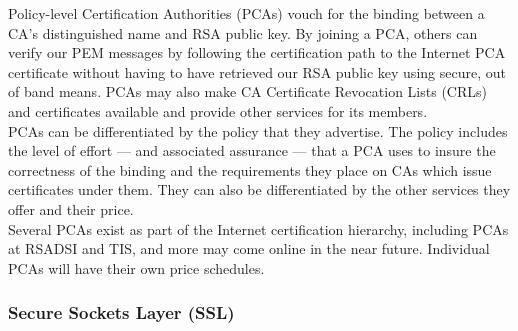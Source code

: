 \begin{htmllist}
    Policy-level Certification Authorities (PCAs) vouch for the binding
    between a CA's distinguished name and RSA public key. By joining a PCA,
    others can verify our PEM messages by following the certification path
    to the Internet PCA certificate without having to have retrieved our
    RSA public key using secure, out of band means. PCAs may also make CA
    Certificate Revocation Lists (CRLs) and certificates available and
    provide other services for its members.\\
    
    PCAs can be differentiated by the policy that they advertise. The
    policy includes the level of effort --- and associated assurance ---
    that a PCA uses to insure the correctness of the binding and the
    requirements they place on CAs which issue certificates under them.
    They can also be differentiated by the other services they offer and
    their price.\\
    
    Several PCAs exist as part of the Internet certification hierarchy,
    including PCAs at RSADSI and TIS, and more may come online in the near
    future. Individual PCAs will have their own price schedules.
\end{htmllist}

\subsubsection{Secure Sockets Layer (SSL)}

